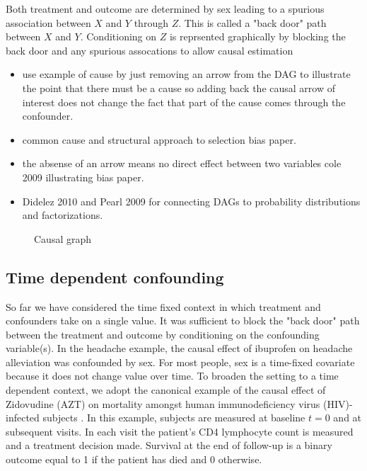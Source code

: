 \documentclass[11pt]{article}
\providecommand{\tightlist}{%
      \setlength{\itemsep}{0pt}\setlength{\parskip}{0pt}}
\begin{document}
Both treatment and outcome are determined by sex leading to a spurious
association between \(X\) and \(Y\) through \(Z\). This is called a
"back door" path between \(X\) and \(Y\). Conditioning on \(Z\) is
reprsented graphically by blocking the back door and any spurious
assocations to allow causal estimation

\begin{itemize}
\tightlist
\item
  use example of cause by just removing an arrow from the DAG to
  illustrate the point that there must be a cause so adding back the
  causal arrow of interest does not change the fact that part of the
  cause comes through the confounder.
\item
  common cause and structural approach to selection bias paper.
\item
  the absense of an arrow means no direct effect between two variables
  cole 2009 illustrating bias paper.
\item
  Didelez 2010 and Pearl 2009 for connecting DAGs to probability
  distributions and factorizations.
\end{itemize}

    \begin{figure}
\caption{Causal graph}
\end{figure}

    \subsection{Time dependent
confounding}\label{time-dependent-confounding}

So far we have considered the time fixed context in which treatment and
confounders take on a single value. It was sufficient to block the "back
door" path between the treatment and outcome by conditioning on the
confounding variable(s). In the headache example, the causal effect of
ibuprofen on headache alleviation was confounded by sex. For most
people, sex is a time-fixed covariate because it does not change value
over time. To broaden the setting to a time dependent context, we adopt
the canonical example of the causal effect of Zidovudine (AZT) on
mortality amongst human immunodeficiency virus (HIV)-infected subjects
\citet{Hernan2000}. In this example, subjects are measured at baseline
\(t = 0\) and at subsequent visits. In each visit the patient's CD4
lymphocyte count is measured and a treatment decision made. Survival at
the end of follow-up is a binary outcome equal to 1 if the patient has
died and 0 otherwise. \linebreak
\end{document}
